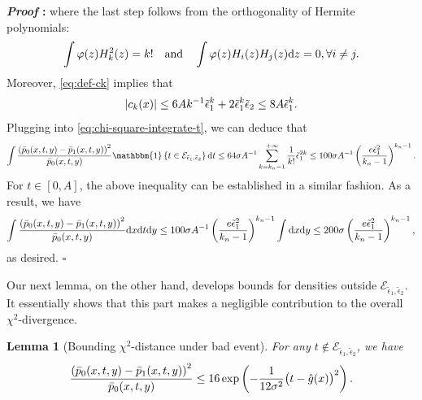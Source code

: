 \documentclass{article}
\def\eps{{\epsilon}}
\def\gE{{\mathcal{E}}}
\newcommand{\dd}{\textup{d}}
\newtheorem{lemma}{Lemma}[section]
\renewenvironment{proof}{\noindent\textbf{\textit{Proof }:}}{\hfill$\square$}
\begin{document}
\begin{proof}
    where the last step follows from the orthogonality of Hermite polynomials:
    \begin{equation}
        \notag
        \int \varphi(z)H_k^2(z) = k! \quad \text{and} \quad \int \varphi(z)H_i(z)H_j(z)\dd z = 0 , \forall i\neq j.
    \end{equation}
    Moreover, \eqref{eq:def-ck} implies that
    \begin{equation}
        \notag
        |c_k(x)| \leq 6Ak^{-1}\tilde{\eps}_1^k + 2\tilde{\eps}_1^k\tilde{\eps}_2 \leq 8A\tilde{\eps}_1^k.
    \end{equation}
    Plugging into \eqref{eq:chi-square-integrate-t}, we can deduce that
    \begin{equation}
        \notag
        \int \frac{\left(\bar{p}_0(x,t,y)-\bar{p}_1(x,t,y)\right)^2}{\bar{p}_0(x,t,y)} \mathbbm{1}\left\{t\in\gE_{\tilde{\eps}_1,\tilde{\eps}_2}\right\} \dd t \leq 64\sigma A^{-1} \sum_{k=k_n-1}^{+\infty} \frac{1}{k!} \tilde{\eps}_1^{2k} \leq 100\sigma A^{-1} \left(\frac{e\tilde{\eps}_1^2}{k_n-1}\right)^{k_n-1}.
    \end{equation}
    For $t\in [0,A]$, the above inequality can be established in a similar fashion. As a result, we have
    \begin{equation}
        \notag
        \int\frac{\left(\bar{p}_0(x,t,y)-\bar{p}_1(x,t,y)\right)^2}{\bar{p}_0(x,t,y)}\dd x\dd t\dd y \leq 100\sigma A^{-1} \left(\frac{e\tilde{\eps}_1^2}{k_n-1}\right)^{k_n-1} \int \dd x \dd y \leq 200\sigma\left(\frac{e\tilde{\eps}_1^2}{k_n-1}\right)^{k_n-1},
    \end{equation}
    as desired.
\end{proof}

Our next lemma, on the other hand, develops bounds for densities outside $\gE_{\tilde{\eps}_1,\tilde{\eps}_2}$. It essentially shows that this part makes a negligible contribution to the overall $\chi^2$-divergence.
\begin{lemma}[Bounding $\chi^2$-distance under bad event]
\label{lemma:chi-square-bad}
    For any $t\notin\gE_{\tilde{\eps}_1,\tilde{\eps}_2}$, we have
    \begin{equation}
        \notag
        \frac{\left(\bar{p}_0(x,t,y)-\bar{p}_1(x,t,y)\right)^2}{\bar{p}_0(x,t,y)} \leq 16\exp\left(-\frac{1}{12\sigma^2}\big(t-\hat{g}(x)\big)^2\right).
    \end{equation}
\end{lemma}
\end{document}
